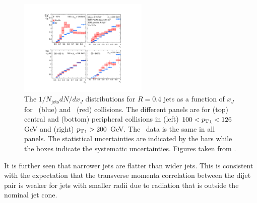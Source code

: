 \begin{figure}[htbp]
\begin{center}
\includegraphics[width=0.55\textwidth]{figures/jetMeasurements/xJ}
\caption{The $1/N_\mathrm{jets} dN/dx_J$ distributions for $R=0.4$ jets as a function of $x_J$ for \pp\ (blue) and \pbpb\ (red) collisions.
The different panels are for (top) central and (bottom) peripheral collisions in (left) $100 < \mbox{$p_{\mathrm{T}}$}_1 < 126$ GeV and (right) $\mbox{$p_{\mathrm{T}}$}_1 > 200 $ GeV.
The \pp\ data is the same in all panels.
The statistical uncertainties are indicated by the bars while the boxes indicate the systematic uncertainties.
Figures taken from \cite{Aaboud:2017eww}.}
\label{fig:xJ}
\end{center}
\end{figure}

It is further seen that narrower jets are flatter than wider jets.
This is consistent with the expectation that the transverse momenta correlation between the dijet pair is weaker for jets with smaller radii due to radiation that is outside the nominal jet cone.


%
